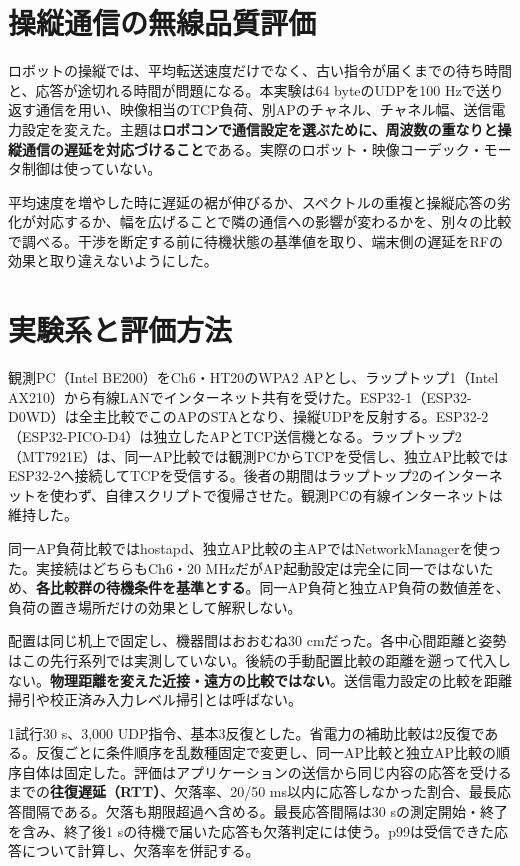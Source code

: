 \documentclass[a4paper,10pt]{ltjsarticle}
\begin{document}
\section{操縦通信の無線品質評価}
ロボットの操縦では、平均転送速度だけでなく、古い指令が届くまでの待ち時間と、応答が途切れる時間が問題になる。本実験は64 byteのUDPを100 Hzで送り返す通信を用い、映像相当のTCP負荷、別APのチャネル、チャネル幅、送信電力設定を変えた。主題は\textbf{ロボコンで通信設定を選ぶために、周波数の重なりと操縦通信の遅延を対応づけること}である。実際のロボット・映像コーデック・モータ制御は使っていない。

平均速度を増やした時に遅延の裾が伸びるか、スペクトルの重複と操縦応答の劣化が対応するか、幅を広げることで隣の通信への影響が変わるかを、別々の比較で調べる。干渉を断定する前に待機状態の基準値を取り、端末側の遅延をRFの効果と取り違えないようにした。

\section{実験系と評価方法}
観測PC（Intel BE200）をCh6・HT20のWPA2 APとし、ラップトップ1（Intel AX210）から有線LANでインターネット共有を受けた。ESP32-1（ESP32-D0WD）は全主比較でこのAPのSTAとなり、操縦UDPを反射する。ESP32-2（ESP32-PICO-D4）は独立したAPとTCP送信機となる。ラップトップ2（MT7921E）は、同一AP比較では観測PCからTCPを受信し、独立AP比較ではESP32-2へ接続してTCPを受信する。後者の期間はラップトップ2のインターネットを使わず、自律スクリプトで復帰させた。観測PCの有線インターネットは維持した。

同一AP負荷比較ではhostapd、独立AP比較の主APではNetworkManagerを使った。実接続はどちらもCh6・20 MHzだがAP起動設定は完全に同一ではないため、\textbf{各比較群の待機条件を基準とする}。同一AP負荷と独立AP負荷の数値差を、負荷の置き場所だけの効果として解釈しない。

配置は同じ机上で固定し、機器間はおおむね30 cmだった。各中心間距離と姿勢はこの先行系列では実測していない。後続の手動配置比較の距離を遡って代入しない。\textbf{物理距離を変えた近接・遠方の比較ではない}。送信電力設定の比較を距離掃引や校正済み入力レベル掃引とは呼ばない。

1試行30 s、3,000 UDP指令、基本3反復とした。省電力の補助比較は2反復である。反復ごとに条件順序を乱数種固定で変更し、同一AP比較と独立AP比較の順序自体は固定した。評価はアプリケーションの送信から同じ内容の応答を受けるまでの\textbf{往復遅延（RTT）}、欠落率、20/50 ms以内に応答しなかった割合、最長応答間隔である。欠落も期限超過へ含める。最長応答間隔は30 sの測定開始・終了を含み、終了後1 sの待機で届いた応答も欠落判定には使う。p99は受信できた応答について計算し、欠落率を併記する。
\end{document}
